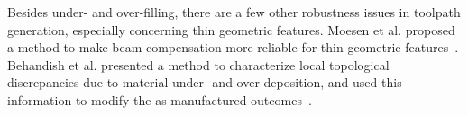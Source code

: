 Besides under- and over-filling, there are a few other robustness issues in toolpath generation, especially concerning thin geometric features. Moesen et al. proposed a method to make beam compensation more reliable for thin geometric features~\cite{Moesen2011}. Behandish et al. presented a method to characterize local topological discrepancies due to material under- and over-deposition, and used this information to modify the as-manufactured outcomes~\cite{Behandish2019a}.














